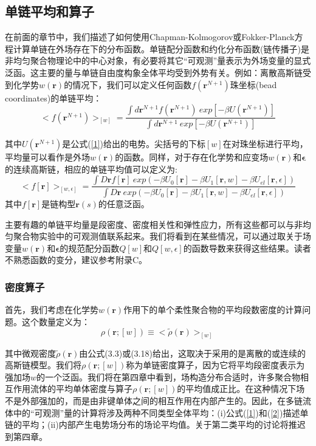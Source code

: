\subsection{单链平均和算子}
在前面的章节中，我们描述了如何使用Chapman-Kolmogorov或Fokker-Planck方程计算单链在外场存在下的分布函数。单链配分函数和约化分布函数(链传播子)是非均匀聚合物理论中的中心对象，有必要将其它“可观测”量表示为外场变量的显式泛函。这主要的量与单链自由度构象全体平均受到外势有关。例如：离散高斯链受到化学势$w (\mathbf{r})$的情况下，我们可以定义任何函数$f(\mathbf{r}^{N+1})$珠坐标(bead coordinates)的单链平均：
\begin{equation}\label{1}
<f(\mathbf{r}^{N+1})>_{[w]}= \frac{\int d \mathbf{r}^{N+1} f(\mathbf{r}^{N+1})~exp[-\beta U(\mathbf{r}^{N+1})]}{\int d\mathbf{r}^{N+1}~exp[-\beta U(\mathbf{r}^{N+1})]}
\end{equation}

其中$U(\mathbf{r}^{N+1})$是公式(\ref{1})给出的电势。尖括号的下标$[w]$在对珠坐标进行平均，平均量可以看作是外场$w(\mathbf{r})$的函数。同样，对于存在化学势和应变场$w(\mathbf{r})$和$\mathbf{\epsilon}$的连续高斯链，相应的单链平均值可以定义为:
\begin{equation}\label{2}
<f[\mathbf{r}]>_{[w ,\epsilon]}=\frac{\int D\mathbf{r}f[\mathbf{r}]~exp(-\beta U_{0}[\mathbf{r}]-\beta U_{1}[\mathbf{r},w]-\beta U_{el}[\mathbf{r},\epsilon])}{\int D\mathbf{r}~exp(-\beta U_{0}[\mathbf{r}]-\beta U_{1}[\mathbf{r},w]-\beta U_{el}[\mathbf{r},\epsilon])}
\end{equation}
其中$f[\mathbf{r}]$是链构型$\mathbf{r}(s)$的任意泛函。

主要有趣的单链平均量是段密度、密度相关性和弹性应力，所有这些都可以与非均匀聚合物实验中的可观测值联系起来。我们将看到在某些情况，可以通过取关于场变量$w(\mathbf{r})$和$\mathbf{\epsilon}$的规范配分函数$Q[w]$和$Q[w,\epsilon]$的函数导数来获得这些结果。读者不熟悉函数的变分，建议参考附录C。
\subsubsection{密度算子}
首先，我们考虑在化学势$w(\mathbf{r})$作用下的单个柔性聚合物的平均段数密度的计算问题。这个数量定义为：
\begin{equation}\label{3}
\rho(\mathbf{r};[w])\equiv<\tilde{\rho}(\mathbf{r})>_{[w]}
\end{equation}

其中微观密度$\tilde{\rho}(\mathbf{r})$由公式(3.3)或(3.18)给出，这取决于采用的是离散的或连续的高斯链模型。我们将$\rho(\mathbf{r};[w])$称为单链密度算子，因为它将平均段密度表示为强加场$w$的一个泛函。我们将在第四章中看到，场构造分布合适时，许多聚合物相互作用流体的平均单体密度与算子$\rho(\mathbf{r};[w])$的平均值成正比。在这种情况下场不是外部强加的，而是由非键单体之间的相互作用在内部产生的。因此，在多链流体中的“可观测”量的计算将涉及两种不同类型全体平均：(i)公式(\ref{1})和(\ref{2})描述单链的平均；(ii)内部产生电势场分布的场论平均值。关于第二类平均的讨论将推迟到第四章。

